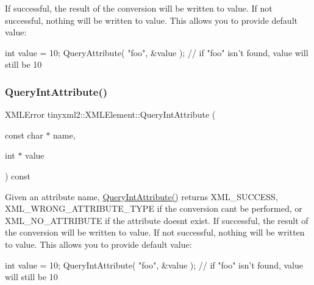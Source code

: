 If successful, the result of the conversion will be written to \textquotesingle{}value\textquotesingle{}. If not successful, nothing will be written to \textquotesingle{}value\textquotesingle{}. This allows you to provide default value\+:

\begin{DoxyVerb}int value = 10;
QueryAttribute( "foo", &value );        // if "foo" isn't found, value will still be 10
\end{DoxyVerb}
 \mbox{\label{classtinyxml2_1_1XMLElement_a8a78bc1187c1c45ad89f2690eab567b1}} 
\subsubsection{\texorpdfstring{QueryIntAttribute()}{QueryIntAttribute()}}
{\footnotesize\ttfamily X\+M\+L\+Error tinyxml2\+::\+X\+M\+L\+Element\+::\+Query\+Int\+Attribute (\begin{DoxyParamCaption}\item[{const char $\ast$}]{name,  }\item[{int $\ast$}]{value }\end{DoxyParamCaption}) const\hspace{0.3cm}{\ttfamily [inline]}}

Given an attribute name, \mbox{\hyperlink{classtinyxml2_1_1XMLElement_a8a78bc1187c1c45ad89f2690eab567b1}{Query\+Int\+Attribute()}} returns X\+M\+L\+\_\+\+S\+U\+C\+C\+E\+SS, X\+M\+L\+\_\+\+W\+R\+O\+N\+G\+\_\+\+A\+T\+T\+R\+I\+B\+U\+T\+E\+\_\+\+T\+Y\+PE if the conversion can\textquotesingle{}t be performed, or X\+M\+L\+\_\+\+N\+O\+\_\+\+A\+T\+T\+R\+I\+B\+U\+TE if the attribute doesn\textquotesingle{}t exist. If successful, the result of the conversion will be written to \textquotesingle{}value\textquotesingle{}. If not successful, nothing will be written to \textquotesingle{}value\textquotesingle{}. This allows you to provide default value\+:

\begin{DoxyVerb}int value = 10;
QueryIntAttribute( "foo", &value );     // if "foo" isn't found, value will still be 10
\end{DoxyVerb}
 \mbox{\label{classtinyxml2_1_1XMLElement_a926357996bef633cb736e1a558419632}} 
